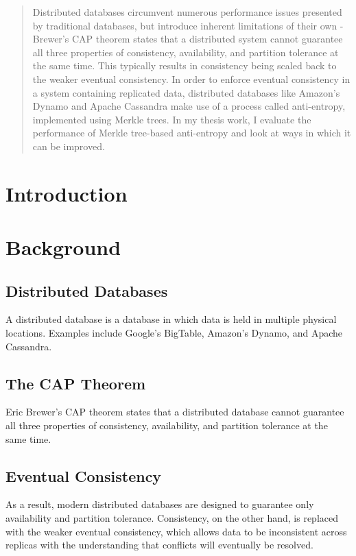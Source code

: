 \documentclass[11pt,letterpaper]{article}
\begin{document}
\maketitle

\newpage 

\begin{abstract}
Distributed databases circumvent numerous performance issues presented by traditional databases, but introduce inherent limitations of their own - Brewer's CAP theorem states that a distributed system cannot guarantee all three properties of consistency, availability, and partition tolerance at the same time. This typically results in consistency being scaled back to the weaker eventual consistency. In order to enforce eventual consistency in a system containing replicated data, distributed databases like Amazon's Dynamo and Apache Cassandra make use of a process called anti-entropy, implemented using Merkle trees. In my thesis work, I evaluate the performance of Merkle tree-based anti-entropy and look at ways in which it can be improved.
\end{abstract}

\newpage 

\tableofcontents

\newpage 

\section{Introduction}

\section{Background}

\subsection{Distributed Databases}
A distributed database is a database in which data is held in multiple physical locations. Examples include Google's BigTable, Amazon's Dynamo, and Apache Cassandra.

\subsection{The CAP Theorem}
Eric Brewer's CAP theorem states that a distributed database cannot guarantee all three properties of consistency, availability, and partition tolerance at the same time.

\subsection{Eventual Consistency}
As a result, modern distributed databases are designed to guarantee only availability and partition tolerance. Consistency, on the other hand, is replaced with the weaker eventual consistency, which allows data to be inconsistent across replicas with the understanding that conflicts will eventually be resolved.
\end{document}
